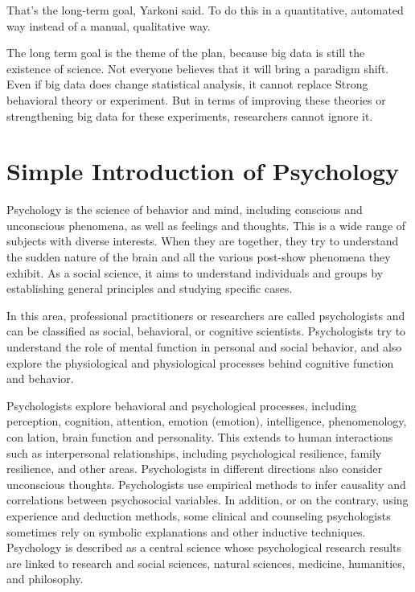 That’s the long-term goal, Yarkoni said. To do this in a quantitative, 
automated way instead of a manual, qualitative way\cite{editor00}.

The long term goal is the theme of the plan, because big data is 
still the existence of science. Not everyone believes that it will 
bring a paradigm shift. Even if big data does change statistical analysis, 
it cannot replace Strong behavioral theory or experiment. But in terms of 
improving these theories or strengthening big data for these experiments, 
researchers cannot ignore it.

\section{Simple Introduction of Psychology}

Psychology is the science of behavior and mind, including conscious 
and unconscious phenomena, as well as feelings and thoughts. This is 
a wide range of subjects with diverse interests. When they are 
together, they try to understand the sudden nature of the brain and 
all the various post-show phenomena they exhibit. As a social science,
 it aims to understand individuals and groups by establishing general
 principles and studying specific cases\cite{editor01}.

In this area, professional practitioners or researchers are called 
psychologists and can be classified as social, behavioral, or 
cognitive scientists. Psychologists try to understand the role of 
mental function in personal and social behavior, and also explore 
the physiological and physiological processes behind cognitive 
function and behavior\cite{editor01}.

Psychologists explore behavioral and psychological processes, 
including perception, cognition, attention, emotion (emotion), 
intelligence, phenomenology, con lation, brain function and 
personality. This extends to human interactions such as interpersonal
 relationships, including psychological resilience, family resilience,
 and other areas. Psychologists in different directions also consider
 unconscious thoughts.\cite{editor02} Psychologists use empirical 
methods to infer causality and correlations between psychosocial variables. 
In addition, or on the contrary, using experience and deduction methods,
 some clinical and counseling psychologists sometimes rely on 
symbolic explanations and other inductive techniques. Psychology is 
described as a central science whose psychological research results 
are linked to research and social sciences, natural sciences, 
medicine, humanities, and philosophy.

